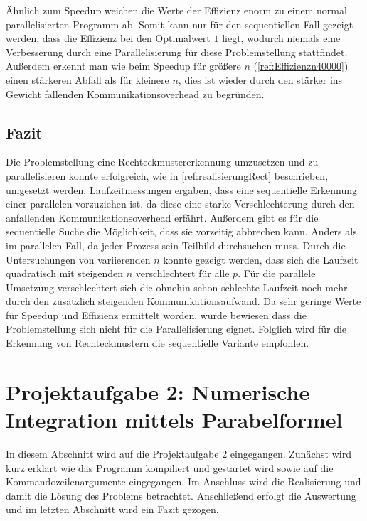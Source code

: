 Ähnlich zum Speedup weichen die Werte der Effizienz enorm zu einem normal parallelisierten Programm ab. 
Somit kann nur für den sequentiellen Fall gezeigt werden, dass die Effizienz bei den Optimalwert $1$ liegt, wodurch niemals eine Verbesserung durch eine Parallelisierung für diese Problemstellung stattfindet. Außerdem erkennt man wie beim Speedup für größere $n$ (\autoref{ref:Effizienzn40000}) einen stärkeren Abfall als für kleinere $n$, dies ist wieder durch den stärker ins Gewicht fallenden Kommunikationsoverhead zu begründen.

\subsection{Fazit}
Die Problemstellung eine Rechteckmustererkennung umzusetzen und zu parallelisieren konnte erfolgreich, wie in \autoref{ref:realisierungRect} beschrieben, umgesetzt werden. 
Laufzeitmessungen ergaben, dass eine sequentielle Erkennung einer parallelen vorzuziehen ist, da diese eine starke Verschlechterung durch den anfallenden Kommunikationsoverhead erfährt. 
Außerdem gibt es für die sequentielle Suche die Möglichkeit, dass sie vorzeitig abbrechen kann. 
Anders als im parallelen Fall, da jeder Prozess sein Teilbild durchsuchen muss.
Durch die Untersuchungen von variierenden $n$ konnte gezeigt werden, dass sich die Laufzeit quadratisch mit steigenden $n$ verschlechtert für alle $p$.
Für die parallele Umsetzung verschlechtert sich die ohnehin schon schlechte Laufzeit noch mehr durch den zusätzlich steigenden Kommunikationsaufwand.
Da sehr geringe Werte für Speedup und Effizienz ermittelt worden, wurde bewiesen dass die Problemstellung sich nicht für die Parallelisierung eignet.
Folglich wird für die Erkennung von Rechteckmustern die sequentielle Variante empfohlen.

\pagebreak
\section{Projektaufgabe 2: Numerische Integration mittels Parabelformel}
\lstset{language=Fortran,frame=none, keepspaces=false,tabsize=1,captionpos=b, basicstyle=\scriptsize,showstringspaces=false,breaklines=true}  
In diesem Abschnitt wird auf die Projektaufgabe 2 eingegangen.
Zunächst wird kurz erklärt wie das Programm kompiliert und gestartet wird sowie auf die Kommandozeilenargumente eingegangen.
Im Anschluss wird die Realisierung und damit die Lösung des Problems betrachtet.
Anschließend erfolgt die Auswertung und im letzten Abschnitt wird ein Fazit gezogen.

